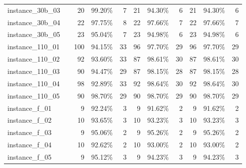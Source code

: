 \documentclass[12pt,a4paper,openright,twoside]{book}
\begin{document}
\begin{table}[H]
{\begin{tabular}{|ll|rrr|rrr|rrr|}
instance\_30b\_03              &     &      20  &    99.20\%  &   7    &   21  &    94.30\%  &   6   &   21  &     94.30\%  &   6  \\    
instance\_30b\_04              &     &      22  &    97.75\%  &   8    &   22  &    97.66\%  &   7   &   22  &     97.66\%  &   7  \\    
instance\_30b\_05              &     &      23  &    95.04\%  &   7    &   23  &    94.98\%  &   6   &   23  &     94.98\%  &   6  \\    
instance\_110\_01             &     &      100  &  94.15\%  &   33    &   96  &  97.70\%  &   29    &   96  &   97.70\%  &   29  \\         
instance\_110\_02             &     &      92  &   93.60\%  &   33    &   87  &  98.61\%  &   30    &   87  &   98.61\%  &   30  \\         
instance\_110\_03             &     &      90  &  94.47\%  &   29     &   87  &  98.15\%  &   28    &   87  &   98.15\%  &   28  \\      
instance\_110\_04             &     &      98  &  92.89\%  &   33     &   92  &  98.64\%  &   30    &   92  &   98.64\%  &   30  \\      
instance\_110\_05             &     &      90  &  98.70\%  &   29     &   90  &  98.70\%  &   29    &   90  &   98.70\%  &   29  \\ 
instance\_f\_01               &     &      9  &    92.24\%  &   3     &   9  &    91.62\%  &   2    &   9  &     91.62\%  &   2  \\   
instance\_f\_02               &     &      10  &    93.65\%  &   3    &   10  &    93.23\%  &   3   &   10  &     93.23\%  &   3  \\    
instance\_f\_03               &     &      9  &    95.06\%  &   2     &   9  &    95.26\%  &   2    &   9  &     95.26\%  &   2  \\   
instance\_f\_04               &     &      10  &    92.62\%  &   2    &   10  &    93.00\%  &   2   &   10  &     93.00\%  &   2  \\    
instance\_f\_05               &     &      9  &    95.12\%  &   3     &   9  &    94.23\%  &   3    &   9  &     94.23\%  &   3  \\ 
 \hline
\end{tabular}
}
\end{table}
\end{document}
